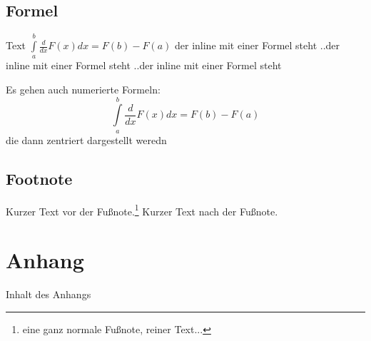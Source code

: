 \section{Formel}
Text $\int\limits_a^b {\frac{d}{dx}F(x)dx} = F(b)-F(a)$ der inline mit einer Formel steht ..der inline mit einer Formel steht ..der inline mit einer Formel steht

Es gehen auch numerierte Formeln:
\begin{equation}
\int\limits_a^b {\frac{d}{dx}F(x)dx} = F(b)-F(a)
\end{equation}
die dann zentriert dargestellt weredn

\section{Footnote}
Kurzer Text vor der Fußnote.\footnote{eine ganz normale Fußnote, reiner Text...} Kurzer Text nach der Fußnote.


\seAppendix{}

\setcounter{page}{7}

\chapter{Anhang}

Inhalt des Anhangs

\newpage
\sePrintGlossary{}


\sePrintBibliography{}



\seEhrenwoertlicheErklaerung{}


